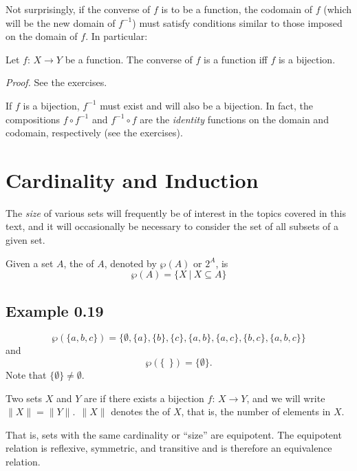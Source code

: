 Not surprisingly, if the converse of $f$ is to be a function, the codomain of
$f$ (which will be the new domain of $f^{-1}$) must satisfy conditions similar
to those imposed on the domain of $f$. In particular:

\begin{thm}\label{thm-0.3}
Let $f$: $X\rightarrow Y$ be a function. The converse of $f$ is a function iff
$f$ is a bijection.

\emph{Proof.} See the exercises.
\end{thm}

If $f$ is a bijection, $f^{-1}$ must exist and will also be a bijection. In
fact, the compositions $f \circ f^{-1}$ and $f^{-1} \circ f$ are the
\emph{identity} functions on the domain and codomain, respectively (see the
exercises).

\section{Cardinality and Induction}\label{sec-0.4}

The \emph{size} of various sets will frequently be of interest in the topics
covered in this text, and it will occasionally be necessary to consider the set
of all subsets of a given set.

\begin{dfn}\label{dfn-0.19}
Given a set $A$, the \emph{} of $A$, denoted by $\wp (A)$ or
$2^A$, is $$\wp(A) = \{X\ |\ X \subseteq A\}$$
\end{dfn}

\subsection*{Example 0.19}

\[\wp(\{a,b,c\}) =
	\{\emptyset,\{a\},\{b\},\{c\},\{a,b\},\{a,c\},\{b,c\},\{a,b,c\}\}\]
and
\[\wp(\{\ \ \})=\{\emptyset\}.\]
Note that $\{\emptyset\} \not= \emptyset$.

\begin{dfn}\label{dfn-0.20}
Two sets $X$ and $Y$ are \emph{} if there exists a bijection
$f$: $X \rightarrow Y$, and we will write $\| X\| = \| Y\|.\ \ \| X\|$ denotes the
\emph{} of $X$, that is, the number of elements in $X$.
\end{dfn}

That is, sets with the same cardinality or ``size'' are equipotent. The
equipotent relation is reflexive, symmetric, and transitive and is therefore an
equivalence relation.

